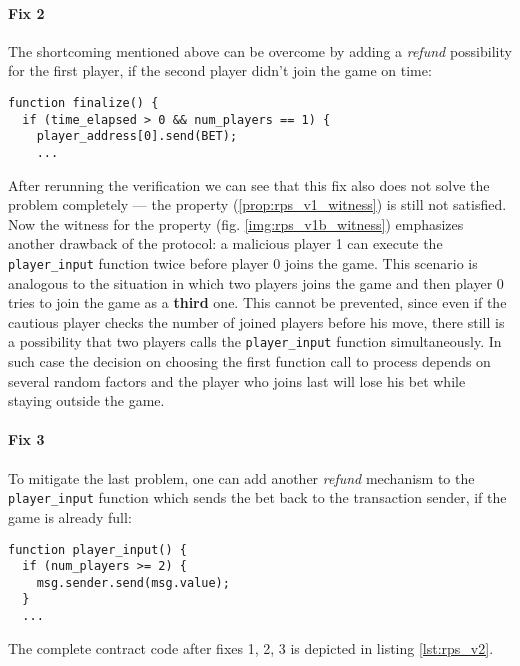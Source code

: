 \documentclass{article}
\begin{document}
\paragraph{Fix 2}

The shortcoming mentioned above can be overcome by adding a \emph{refund} possibility for the first player, if the second player
didn't join the game on time:
\begin{lstlisting}
function finalize() {
  if (time_elapsed > 0 && num_players == 1) {
    player_address[0].send(BET);
    ...
\end{lstlisting}

After rerunning the verification we can see that this fix also does not solve the problem completely --- the property 
(\ref{prop:rps_v1_witness}) is still not satisfied.
Now the witness for the property (fig. \ref{img:rps_v1b_witness}) emphasizes another drawback of the protocol:
a malicious player 1 can execute the \lstinline{player_input} function twice before player 0 joins the game.
This scenario is analogous to the situation in which two players joins the game and then player 0 tries to join
the game as a \textbf{third} one.
This cannot be prevented, since even if the cautious player checks the number of joined players before his move,
there still is a possibility that two players calls the \lstinline{player_input} function simultaneously.
In such case the decision on choosing the first function call to process depends on several random factors and the player
who joins last will lose his bet while staying outside the game.

\paragraph{Fix 3}

To mitigate the last problem, one can add another \emph{refund} mechanism to the \lstinline{player_input} function
which sends the bet back to the transaction sender, if the game is already full:
\begin{lstlisting}
function player_input() {
  if (num_players >= 2) {
    msg.sender.send(msg.value);
  }
  ...
\end{lstlisting}

The complete contract code after fixes 1, 2, 3 is depicted in listing \ref{lst:rps_v2}.

  
\end{document}
